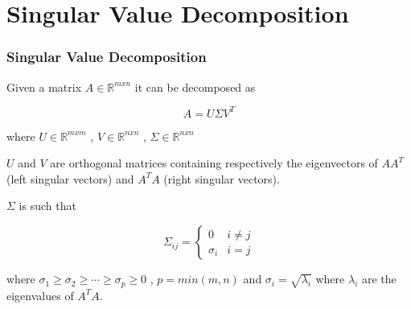 \documentclass[10pt]{beamer}
\begin{document}
\section{Singular Value Decomposition}
\begin{frame}
    \frametitle{Singular Value Decomposition}
    Given a matrix $ A \in \mathbb{R}^{m x n} $ it can be decomposed as 
    
    \begin{equation}
        A = U \Sigma V^T
    \end{equation}

    where $ U \in \mathbb{R}^{m x m} $ , $ V \in \mathbb{R}^{n x n} $ , $ \Sigma \in \mathbb{R}^{n x n} $ \vspace{3 pt}

    $ U $ and $ V $ are orthogonal matrices containing respectively the eigenvectors of $ A A^T $ (left singular vectors) and $ A^T A $ (right singular vectors). \vspace{5 pt}

    $ \Sigma $ is such that 

    \begin{equation}
        \Sigma_{ij} = \left\{
                \begin{array}{ll}
                    0 & i \neq j \\
                    \sigma_i & i = j
                \end{array}
            \right.
    \end{equation}

    \vspace{3 pt}

    where $ \sigma_1 \geq \sigma_2 \geq \cdots \geq \sigma_p \geq 0 $ , $ p = min(m, n) $ and $ \sigma_i = \sqrt{\lambda_i} $ where $ \lambda_i $ are the eigenvalues of $ A^T A $.
\end{frame}
\end{document}
